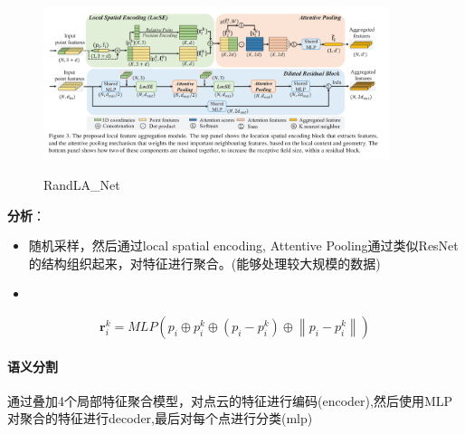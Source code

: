 \documentclass[a4paper,12pt]{article}
\begin{document}
	\begin{figure}[H]
	\begin{center}
		\includegraphics[width=0.9\textwidth]{img/RandLA_Net.png} 
		\caption{RandLA\_Net}
	\end{center}
\end{figure}


\textbf{分析}：
\begin{itemize}
	\item 随机采样，然后通过local spatial encoding, Attentive Pooling通过类似ResNet的结构组织起来，对特征进行聚合。(能够处理较大规模的数据)
	\item 
\end{itemize}
	$$
\mathbf{r}_{i}^{k}=M L P\left(p_{i} \oplus p_{i}^{k} \oplus\left(p_{i}-p_{i}^{k}\right) \oplus\left\|p_{i}-p_{i}^{k}\right\|\right)
$$


\paragraph{语义分割} 通过叠加4个局部特征聚合模型，对点云的特征进行编码(encoder),然后使用MLP对聚合的特征进行decoder,最后对每个点进行分类(mlp)
\end{document}
